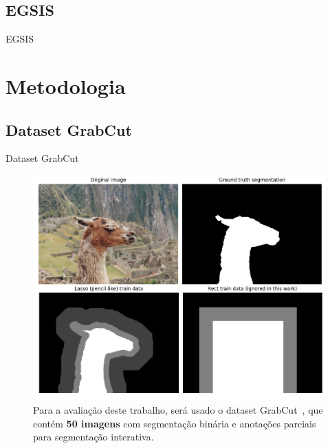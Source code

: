\documentclass{templatebeamerufc/libs/ufc_format}
\begin{document}
\subsection{EGSIS}

\begin{frame}{EGSIS}

\end{frame}

\section{Metodologia}

\subsection{Dataset GrabCut}
\begin{frame}{Dataset GrabCut}

    \begin{figure}\label{fig:grabcut-dataset}
    \centering
    \caption{ Para a avaliação deste trabalho,
será usado o dataset GrabCut~\cite{rother2004grabcut}, que contém
\textbf{50 imagens} com segmentação binária e anotações parciais para
segmentação interativa.}
    \includegraphics[scale=0.21]{figuras/grabcut-dataset}
    \source{\fonteautor}
  \end{figure}

\end{frame}
\end{document}
